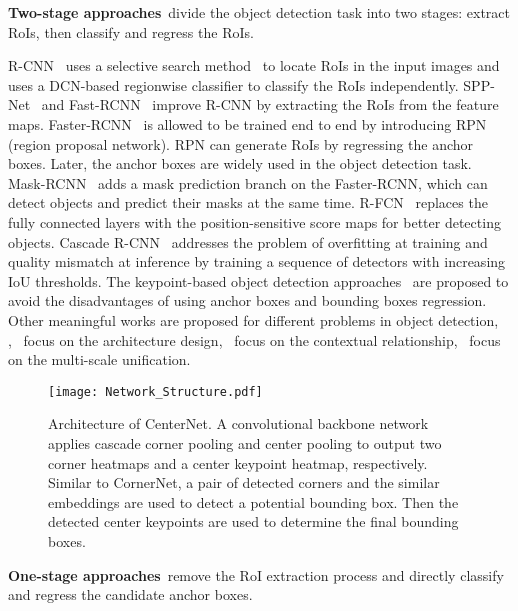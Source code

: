 \documentclass[10pt,twocolumn,letterpaper]{article}
\begin{document}
\vspace{1ex}\noindent \textbf{Two-stage approaches}~divide the object detection task into two stages: extract RoIs, then classify and regress the RoIs.

R-CNN~\cite{girshick2014rich} uses a selective search method~\cite{uijlings2013selective} to locate RoIs in the input images and uses a DCN-based regionwise classifier to classify the RoIs independently. SPP-Net~\cite{he2015spatial} and Fast-RCNN~\cite{girshick2015fast} improve R-CNN by extracting the RoIs from the feature maps. Faster-RCNN~\cite{ren2015faster} is allowed to be trained end to end by introducing RPN (region proposal network). RPN can generate RoIs by regressing the anchor boxes. Later, the anchor boxes are widely used in the object detection task. Mask-RCNN~\cite{he2017mask} adds a mask prediction branch on the Faster-RCNN, which can detect objects and predict their masks at the same time. R-FCN~\cite{dai2016r} replaces the fully connected layers with the position-sensitive score maps for better detecting objects. Cascade R-CNN~\cite{cai2018cascade} addresses the problem of overfitting at training and quality mismatch at inference by training a sequence of detectors with increasing IoU thresholds. The keypoint-based object detection approaches~\cite{tychsen2017denet,Lu2018Grid} are proposed to avoid the disadvantages of using anchor boxes and bounding boxes regression. Other meaningful works are proposed for different problems in object detection, \eg,~\cite{zhu2017couplenet,lee2017me} focus on the architecture design,~\cite{bell2016inside,gidaris2015object,shrivastava2016contextual,zeng2016gated} focus on the contextual relationship,~\cite{li2019scale,cai2016unified} focus on the multi-scale unification.
\begin{figure*}[!tb]
  \centering 
  \texttt{[image: Network\_Structure.pdf]}
  \vspace{-2ex}
  \caption{Architecture of CenterNet. A convolutional backbone network applies cascade corner pooling and center pooling to output two corner heatmaps and a center keypoint heatmap, respectively. Similar to CornerNet, a pair of detected corners and the similar embeddings are used to detect a potential bounding box. Then the detected center keypoints are used to determine the final bounding boxes.} 
  \label{structure} \end{figure*}

\vspace{1ex}\noindent \textbf{One-stage approaches}~remove the RoI extraction process and directly classify and regress the candidate anchor boxes.
\end{document}
